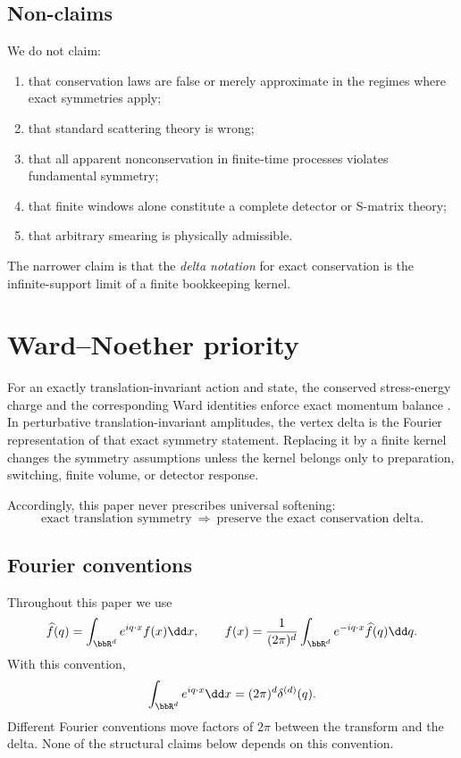 \documentclass[11pt]{article}
\begin{document}
\subsection{Non-claims}

We do not claim:
\begin{enumerate}
\item that conservation laws are false or merely approximate in the regimes where exact symmetries apply;
\item that standard scattering theory is wrong;
\item that all apparent nonconservation in finite-time processes violates fundamental symmetry;
\item that finite windows alone constitute a complete detector or S-matrix theory;
\item that arbitrary smearing is physically admissible.
\end{enumerate}

The narrower claim is that the \emph{delta notation} for exact conservation is the infinite-support limit of a finite bookkeeping kernel.

\section{Ward--Noether priority}

For an exactly translation-invariant action and state, the conserved stress-energy charge and
the corresponding Ward identities enforce exact momentum balance
\cite{Noether1918,Ward1950,Takahashi1957}.  In perturbative translation-invariant amplitudes,
the vertex delta is the Fourier representation of that exact symmetry statement.  Replacing it
by a finite kernel changes the symmetry assumptions unless the kernel belongs only to
preparation, switching, finite volume, or detector response.

Accordingly, this paper never prescribes universal softening:
\[
\boxed{\text{exact translation symmetry}\ \Longrightarrow\
\text{preserve the exact conservation delta}.}
\]


\subsection{Fourier conventions}

Throughout this paper we use
\[
\widehat f(q)=\int_{\bbR^d} e^{iq\cdot x}f(x)\dd x,
\qquad
f(x)=\frac{1}{(2\pi)^d}\int_{\bbR^d}e^{-iq\cdot x}\widehat f(q)\dd q .
\]
With this convention,
\[
\int_{\bbR^d}e^{iq\cdot x}\dd x=(2\pi)^d\delta^{(d)}(q).
\]
Different Fourier conventions move factors of \(2\pi\) between the transform and the delta.  None of the structural claims below depends on this convention.
\end{document}
